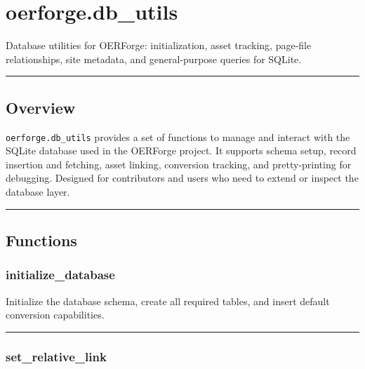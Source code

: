 \section{oerforge.db\_utils}\label{oerforge.db_utils}

Database utilities for OERForge: initialization, asset tracking,
page-file relationships, site metadata, and general-purpose queries for
SQLite.

\begin{center}\rule{0.5\linewidth}{0.5pt}\end{center}

\subsection{Overview}\label{overview}

\texttt{oerforge.db\_utils} provides a set of functions to manage and
interact with the SQLite database used in the OERForge project. It
supports schema setup, record insertion and fetching, asset linking,
conversion tracking, and pretty-printing for debugging. Designed for
contributors and users who need to extend or inspect the database layer.

\begin{center}\rule{0.5\linewidth}{0.5pt}\end{center}

\subsection{Functions}\label{functions}

\subsubsection{initialize\_database}\label{initialize_database}

\begin{Shaded}
\begin{Highlighting}[]
\end{Highlighting}
\end{Shaded}

Initialize the database schema, create all required tables, and insert
default conversion capabilities.

\begin{center}\rule{0.5\linewidth}{0.5pt}\end{center}

\subsubsection{set\_relative\_link}\label{set_relative_link}

